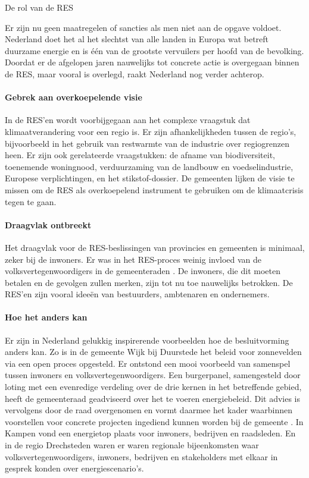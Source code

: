 \begin{voorstel}{De rol van de RES}
\begin{multicols*}{2}
\begin{overwegingen}
Er zijn nu geen maatregelen of sancties als men niet aan de opgave voldoet.
Nederland doet het al het slechtst van alle landen in Europa wat betreft duurzame energie en is één van de grootste vervuilers per hoofd van de bevolking. Doordat er de afgelopen jaren nauwelijks tot concrete actie is overgegaan binnen de RES, maar vooral is overlegd, raakt Nederland nog verder achterop.

\paragraph{Gebrek aan overkoepelende visie}
In de RES’en wordt voorbijgegaan aan het complexe vraagstuk dat klimaatverandering voor een regio is. Er zijn afhankelijkheden tussen de regio’s, bijvoorbeeld in het gebruik van restwarmte van de industrie over regiogrenzen heen. Er zijn ook gerelateerde vraagstukken: de afname van biodiversiteit, toenemende woningnood, verduurzaming van de landbouw en voedselindustrie, Europese verplichtingen, en het stikstof-dossier. De gemeenten lijken de visie te missen om de RES als overkoepelend instrument te gebruiken om de klimaatcrisis tegen te gaan.

\paragraph{Draagvlak ontbreekt}
Het draagvlak voor de RES-beslissingen van provincies en gemeenten is minimaal, zeker bij de inwoners. Er was in het RES-proces weinig invloed van de volksvertegenwoordigers in de gemeenteraden \parencite{prins_eis_2020}. De inwoners, die dit moeten betalen en de gevolgen zullen merken, zijn tot nu toe nauwelijks betrokken. De RES’en zijn vooral ideeën van bestuurders, ambtenaren en ondernemers.

\paragraph{Hoe het anders kan}
Er zijn in Nederland gelukkig inspirerende voorbeelden hoe de besluitvorming anders kan.
Zo is in de gemeente Wijk bij Duurstede het beleid voor zonnevelden via een open proces opgesteld. Er ontstond een mooi voorbeeld van samenspel tussen inwoners en volksvertegenwoordigers. Een burgerpanel, samengesteld door loting met een evenredige verdeling over de drie kernen in het betreffende gebied, heeft de gemeenteraad geadviseerd over het te voeren energiebeleid. Dit advies is vervolgens door de raad overgenomen en vormt daarmee het kader waarbinnen voorstellen voor concrete projecten ingediend kunnen worden bij de gemeente \parencite{burgerpanel_zonnevelden_wijk_bij_duurstede_advies_2019}.
In Kampen vond een energietop plaats voor inwoners, bedrijven en raadsleden. En in de regio Drechsteden waren er waren regionale bijeenkomsten waar volksvertegenwoordigers, inwoners, bedrijven en stakeholders met elkaar in gesprek konden over energiescenario’s.


\end{overwegingen}
\end{multicols*}
\end{voorstel}
